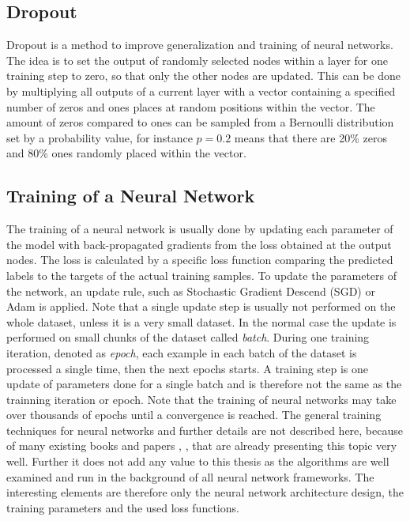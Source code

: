 
\subsection{Dropout}
Dropout \cite{Hinton2012} is a method to improve generalization and training of neural networks.
The idea is to set the output of randomly selected nodes within a layer for one training step to zero, so that only the other nodes are updated.
This can be done by multiplying all outputs of a current layer with a vector containing a specified number of zeros and ones places at random positions within the vector.
The amount of zeros compared to ones can be sampled from a Bernoulli distribution set by a probability value, for instance $p=0.2$ means that there are 20\% zeros and 80\% ones randomly placed within the vector.



\subsection{Training of a Neural Network}
The training of a neural network is usually done by updating each parameter of the model with back-propagated gradients from the loss obtained at the output nodes.
The loss is calculated by a specific loss function comparing the predicted labels to the targets of the actual training samples.
To update the parameters of the network, an update rule, such as Stochastic Gradient Descend (SGD) or Adam \cite{Kingma2015} is applied.
Note that a single update step is usually not performed on the whole dataset, unless it is a very small dataset. 
In the normal case the update is performed on small chunks of the dataset called \emph{batch}.
During one training iteration, denoted as \emph{epoch}, each example in each batch of the dataset is processed a single time, then the next epochs starts.
A training step is one update of parameters done for a single batch and is therefore not the same as the trainning iteration or epoch.
Note that the training of neural networks may take over thousands of epochs until a convergence is reached.
The general training techniques for neural networks and further details are not described here, because of many existing books and papers \cite{LeCun2006}, \cite{Goodfellow2016}, \cite{DeepLearning} that are already presenting this topic very well. 
Further it does not add any value to this thesis as the algorithms are well examined and run in the background of all neural network frameworks.
The interesting elements are therefore only the neural network architecture design, the training parameters and the used loss functions.

